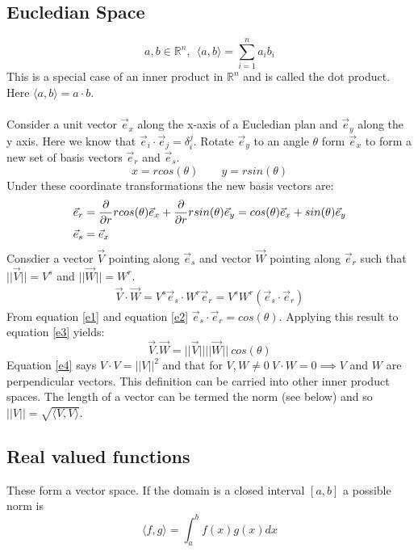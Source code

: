 \documentclass[a4paper]{article}
\newcommand{\norm}[1]{\lvert \lvert #1 \rvert \rvert}
\newcommand{\inner}[1]{\langle #1 \rangle}
\begin{document}
\subsection{Eucledian Space}
\begin{equation}
  a,b \in \mathbb{R}^n, \: \: \inner{a,b} = \sum_{i=1}^n a_i b_i
\end{equation}
This is a special case of an inner product in $\mathbb{R}^n$ and is called the dot product. Here  $\inner{a,b} = a \cdot b$.
\\ \\
Consider a unit vector $\vec{e}_x$ along the x-axis of a Eucledian plan and $\vec{e}_y$ along the y axis. Here we know that $\vec{e}_i \cdot \vec{e}_j = \delta_i^j$. Rotate $\vec{e}_y$ to an angle $\theta$ form $\vec{e}_x$ to form a new set of basis vectors $\vec{e}_r$ and $\vec{e}_s$.
\begin{equation}
  x = r cos(\theta) \qquad y = r sin(\theta)
\end{equation}
Under these coordinate transformations the new basis vectors are:
\begin{align}
  &\vec{e}_r = \pdv{}{r} rcos(\theta) \vec{e}_x + \pdv{}{r} rsin(\theta) \vec{e}_y = cos(\theta)\vec{e}_x + sin(\theta)\vec{e}_y\label{e1}\\
  &\vec{e}_s = \vec{e}_x\label{e2}
\end{align}
Consdier a vector $\vec{V}$ pointing along $\vec{e}_s$ and vector $\vec{W}$ pointing along $\vec{e}_r$ such that $\norm{\vec{V}} = V^s$ and $\norm{\vec{W}}=W^r$.
\begin{align}
  \vec{V}\cdot \vec{W} = V^s \vec{e}_s \cdot W^r \vec{e}_r = V^s W^r (\vec{e}_s \cdot \vec{e}_r)\label{e3}
\end{align}
From equation \ref{e1} and equation \ref{e2} $\vec{e}_s \cdot \vec{e}_r = cos(\theta)$. Applying this result to equation \ref{e3} yields:
\begin{equation}
  \label{e4}
  \vec{V}.\vec{W}=\norm{\vec{V}} \norm{\vec{W}} \:cos({\theta})
\end{equation}
Equation \ref{e4} says $V \cdot V = \norm{V}^2$ and that for $V,W \ne 0 \: V\cdot W = 0 \implies V$ and $W$ are perpendicular vectors. This definition can be carried into other inner product spaces. The length of a vector can be termed the norm (see below) and so $\norm{V} = \sqrt{\inner{V,V}}$.
\subsection{Real valued functions}
These form a vector space\cite{A003}. If the domain is a closed interval $[a,b]$ a possible norm is
\begin{equation}
  \inner{f,g} = \int_a^b f(x)g(x) dx
\end{equation}
\end{document}
